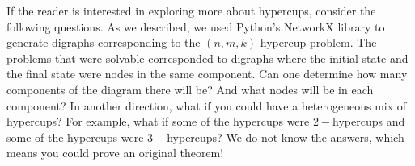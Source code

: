\documentclass{article}
\theoremstyle{theorem}
\theoremstyle{definition}
\begin{document}
If the reader is interested in exploring more about hypercups, consider the following questions.  As we described, we used Python's NetworkX library to generate digraphs corresponding to the $(n,m,k)$-hypercup problem. The problems that were solvable corresponded to digraphs where the initial state and the final state were nodes in the same component. Can one determine how many components of the diagram there will be? And what nodes will be in each component? In another direction, what if you could have a heterogeneous mix of hypercups? For example, what if some of the hypercups were $2-$hypercups and some of the hypercups were $3-$hypercups? We do not know the answers, which means you could prove an original theorem!






  
\end{document}
